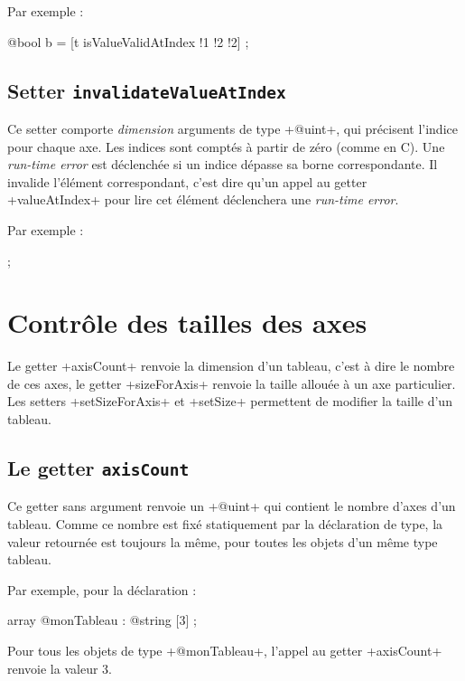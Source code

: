 Par exemple :
\begin{galgas}
  @bool b = [t isValueValidAtIndex !1 !2 !2] ;
\end{galgas}


\subsection{Setter \texttt{invalidateValueAtIndex}}

Ce setter comporte \emph{dimension} arguments de type \ggs+@uint+, qui précisent l'indice pour chaque axe. Les indices sont comptés à partir de zéro (comme en C). Une \emph{run-time error} est déclenchée si un indice dépasse sa borne correspondante. Il invalide l'élément correspondant, c'est dire qu'un appel au getter \ggs+valueAtIndex+ pour lire cet élément déclenchera une \emph{run-time error}.

Par exemple :
\begin{galgas}
  [!?t invalidateValueAtIndex !1 !2 !2] ;
\end{galgas}





\section{Contrôle des tailles des axes}

Le getter \ggs+axisCount+ renvoie la dimension d'un tableau, c'est à dire le nombre de ces axes, le getter \ggs+sizeForAxis+ renvoie la taille allouée à un axe particulier. Les setters \ggs+setSizeForAxis+ et \ggs+setSize+ permettent de modifier la taille d'un tableau.



\subsection{Le getter \texttt{axisCount}}

Ce getter sans argument renvoie un \ggs+@uint+ qui contient le nombre d'axes d'un tableau. Comme ce nombre est fixé statiquement par la déclaration de type, la valeur retournée est toujours la même, pour toutes les objets d'un même type tableau.


Par exemple, pour la déclaration :
\begin{galgas}
array @monTableau : @string [3] ;
\end{galgas}
Pour tous les objets de type \ggs+@monTableau+, l'appel au getter \ggs+axisCount+ renvoie la valeur $3$.


